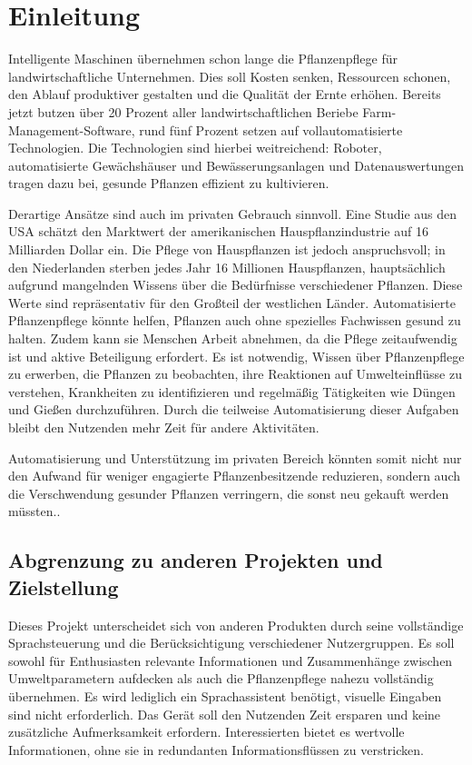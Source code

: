 \section{Einleitung}\label{sec_1}

Intelligente Maschinen übernehmen schon lange die Pflanzenpflege für landwirtschaftliche Unternehmen. Dies soll Kosten senken, Ressourcen schonen, den Ablauf produktiver gestalten und die Qualität der Ernte erhöhen. Bereits jetzt butzen über 20 Prozent aller landwirtschaftlichen Beriebe Farm-Management-Software, rund fünf Prozent setzen auf vollautomatisierte Technologien.\cite{automate2023impactautomationagriculture} Die Technologien sind hierbei weitreichend: Roboter, automatisierte Gewächshäuser und Bewässerungsanlagen und Datenauswertungen tragen dazu bei, gesunde Pflanzen effizient zu kultivieren. 

Derartige Ansätze sind auch im privaten Gebrauch sinnvoll. Eine Studie aus den USA schätzt den Marktwert der amerikanischen Hauspflanzindustrie auf 16 Milliarden Dollar ein\cite{narishkin2022houseplants}. Die Pflege von Hauspflanzen ist jedoch anspruchsvoll; in den Niederlanden sterben jedes Jahr 16 Millionen Hauspflanzen, hauptsächlich aufgrund mangelnden Wissens über die Bedürfnisse verschiedener Pflanzen.\cite{hollandtimes2024plants} Diese Werte sind repräsentativ für den Großteil der westlichen Länder. Automatisierte Pflanzenpflege könnte helfen, Pflanzen auch ohne spezielles Fachwissen gesund zu halten. Zudem kann sie Menschen Arbeit abnehmen, da die Pflege zeitaufwendig ist und aktive Beteiligung erfordert. Es ist notwendig, Wissen über Pflanzenpflege zu erwerben, die Pflanzen zu beobachten, ihre Reaktionen auf Umwelteinflüsse zu verstehen, Krankheiten zu identifizieren und regelmäßig Tätigkeiten wie Düngen und Gießen durchzuführen. Durch die teilweise Automatisierung dieser Aufgaben bleibt den Nutzenden mehr Zeit für andere Aktivitäten.

Automatisierung und Unterstützung im privaten Bereich könnten somit nicht nur den Aufwand für weniger engagierte Pflanzenbesitzende reduzieren, sondern auch die Verschwendung gesunder Pflanzen verringern, die sonst neu gekauft werden müssten..

\subsection{Abgrenzung zu anderen Projekten und Zielstellung}
Dieses Projekt unterscheidet sich von anderen Produkten durch seine vollständige Sprachsteuerung und die Berücksichtigung verschiedener Nutzergruppen. Es soll sowohl für Enthusiasten relevante Informationen und Zusammenhänge zwischen Umweltparametern aufdecken als auch die Pflanzenpflege nahezu vollständig übernehmen. Es wird lediglich ein Sprachassistent benötigt, visuelle Eingaben sind nicht erforderlich. Das Gerät soll den Nutzenden Zeit ersparen und keine zusätzliche Aufmerksamkeit erfordern. Interessierten bietet es wertvolle Informationen, ohne sie in redundanten Informationsflüssen zu verstricken.

